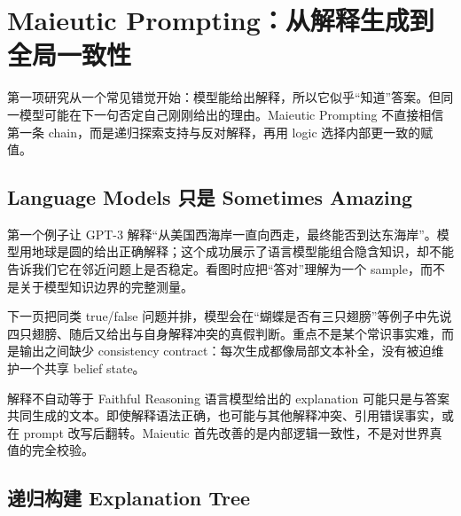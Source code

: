 \section{Maieutic Prompting：从解释生成到全局一致性}

第一项研究从一个常见错觉开始：模型能给出解释，所以它似乎“知道”答案。但同一模型可能在下一句否定自己刚刚给出的理由。Maieutic Prompting 不直接相信第一条 chain，而是递归探索支持与反对解释，再用 logic 选择内部更一致的赋值。

\subsection{Language Models 只是 Sometimes Amazing}

第一个例子让 GPT-3 解释“从美国西海岸一直向西走，最终能否到达东海岸”。模型用地球是圆的给出正确解释；这个成功展示了语言模型能组合隐含知识，却不能告诉我们它在邻近问题上是否稳定。看图时应把“答对”理解为一个 sample，而不是关于模型知识边界的完整测量。


下一页把同类 true/false 问题并排，模型会在“蝴蝶是否有三只翅膀”等例子中先说四只翅膀、随后又给出与自身解释冲突的真假判断。重点不是某个常识事实难，而是输出之间缺少 consistency contract：每次生成都像局部文本补全，没有被迫维护一个共享 belief state。


\begin{warningbox}{解释不自动等于 Faithful Reasoning}
语言模型给出的 explanation 可能只是与答案共同生成的文本。即使解释语法正确，也可能与其他解释冲突、引用错误事实，或在 prompt 改写后翻转。Maieutic 首先改善的是内部逻辑一致性，不是对世界真值的完全校验。
\end{warningbox}


\subsection{递归构建 Explanation Tree}

